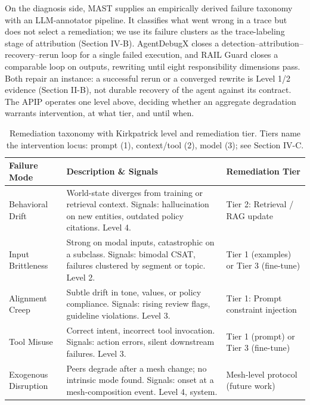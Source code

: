 \documentclass[conference]{IEEEtran}
\begin{document}
On the diagnosis side, MAST \cite{ref8} supplies an empirically derived failure taxonomy with an LLM-annotator pipeline. It classifies what went wrong in a trace but does not select a remediation; we use its failure clusters as the trace-labeling stage of attribution (Section IV-B). AgentDebugX \cite{ref11} closes a detection--attribution--recovery--rerun loop for a single failed execution, and RAIL Guard \cite{ref12} closes a comparable loop on outputs, rewriting until eight responsibility dimensions pass. Both repair an instance: a successful rerun or a converged rewrite is Level 1/2 evidence (Section II-B), not durable recovery of the agent against its contract. The APIP operates one level above, deciding whether an aggregate degradation warrants intervention, at what tier, and until when.

\begin{table}[!t]
\caption{Remediation taxonomy with Kirkpatrick level and remediation tier. Tiers name the intervention locus: prompt (1), context/tool (2), model (3); see Section IV-C.}
\label{tab:taxonomy}
\centering
\footnotesize
\renewcommand{\arraystretch}{1.1}
\begin{tabular}{|>{\raggedright\arraybackslash}p{}|>{\raggedright\arraybackslash}p{}|>{\raggedright\arraybackslash}p{}|}
\hline
\textbf{Failure Mode} & \textbf{Description \& Signals} & \textbf{Remediation Tier} \\
\hline
Behavioral Drift & World-state diverges from training or retrieval context. Signals: hallucination on new entities, outdated policy citations. Level 4. & Tier 2: Retrieval / RAG update \\
\hline
Input Brittleness & Strong on modal inputs, catastrophic on a subclass. Signals: bimodal CSAT, failures clustered by segment or topic. Level 2. & Tier 1 (examples) or Tier 3 (fine-tune) \\
\hline
Alignment Creep & Subtle drift in tone, values, or policy compliance. Signals: rising review flags, guideline violations. Level 3. & Tier 1: Prompt constraint injection \\
\hline
Tool Misuse & Correct intent, incorrect tool invocation. Signals: action errors, silent downstream failures. Level 3. & Tier 1 (prompt) or Tier 3 (fine-tune) \\
\hline
Exogenous Disruption & Peers degrade after a mesh change; no intrinsic mode found. Signals: onset at a mesh-composition event. Level 4, system. & Mesh-level protocol (future work) \\
\hline
\end{tabular}
\end{table}
\end{document}
